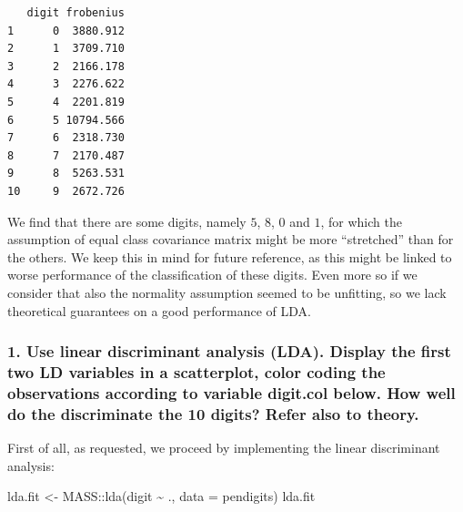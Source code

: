 \documentclass[
  letterpaper,
  DIV=11,
  numbers=noendperiod]{scrartcl}
\newenvironment{Shaded}{\begin{snugshade}}{\end{snugshade}}
\newcommand{\AttributeTok}[1]{\textcolor[rgb]{0.40,0.45,0.13}{#1}}
\newcommand{\FunctionTok}[1]{\textcolor[rgb]{0.28,0.35,0.67}{#1}}
\newcommand{\NormalTok}[1]{\textcolor[rgb]{0.00,0.23,0.31}{#1}}
\newcommand{\OtherTok}[1]{\textcolor[rgb]{0.00,0.23,0.31}{#1}}
\newcommand{\SpecialCharTok}[1]{\textcolor[rgb]{0.37,0.37,0.37}{#1}}
\begin{document}
\begin{verbatim}
   digit frobenius
1      0  3880.912
2      1  3709.710
3      2  2166.178
4      3  2276.622
5      4  2201.819
6      5 10794.566
7      6  2318.730
8      7  2170.487
9      8  5263.531
10     9  2672.726
\end{verbatim}

We find that there are some digits, namely \(5\), \(8\), \(0\) and
\(1\), for which the assumption of equal class covariance matrix might
be more ``stretched'' than for the others. We keep this in mind for
future reference, as this might be linked to worse performance of the
classification of these digits. Even more so if we consider that also
the normality assumption seemed to be unfitting, so we lack theoretical
guarantees on a good performance of LDA.

\hypertarget{use-linear-discriminant-analysis-lda.-display-the-first-two-ld-variables-in-a-scatterplot-color-coding-the-observations-according-to-variable-digit.col-below.-how-well-do-the-discriminate-the-10-digits-refer-also-to-theory.}{%
\subsubsection{1. Use linear discriminant analysis (LDA). Display the
first two LD variables in a scatterplot, color coding the observations
according to variable digit.col below. How well do the discriminate the
10 digits? Refer also to
theory.}\label{use-linear-discriminant-analysis-lda.-display-the-first-two-ld-variables-in-a-scatterplot-color-coding-the-observations-according-to-variable-digit.col-below.-how-well-do-the-discriminate-the-10-digits-refer-also-to-theory.}}

First of all, as requested, we proceed by implementing the linear
discriminant analysis:

\begin{Shaded}
\begin{Highlighting}[]
\NormalTok{lda.fit }\OtherTok{\textless{}{-}}\NormalTok{ MASS}\SpecialCharTok{::}\FunctionTok{lda}\NormalTok{(digit }\SpecialCharTok{\textasciitilde{}}\NormalTok{ ., }\AttributeTok{data =}\NormalTok{ pendigits)}
\NormalTok{lda.fit}
\end{Highlighting}
\end{Shaded}
\end{document}
